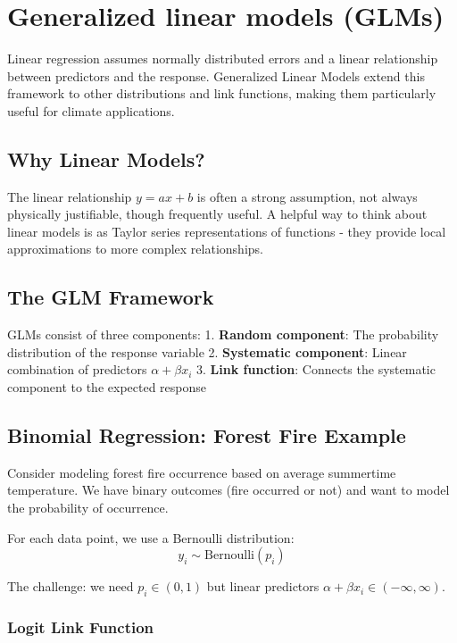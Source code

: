 \documentclass[
  letterpaper,
  DIV=11,
  numbers=noendperiod]{scrreprt}
\begin{document}
\section{Generalized linear models
(GLMs)}\label{generalized-linear-models-glms}

Linear regression assumes normally distributed errors and a linear
relationship between predictors and the response. Generalized Linear
Models extend this framework to other distributions and link functions,
making them particularly useful for climate applications.

\subsection{Why Linear Models?}\label{why-linear-models}

The linear relationship \(y = ax + b\) is often a strong assumption, not
always physically justifiable, though frequently useful. A helpful way
to think about linear models is as Taylor series representations of
functions - they provide local approximations to more complex
relationships.

\subsection{The GLM Framework}\label{the-glm-framework}

GLMs consist of three components: 1. \textbf{Random component}: The
probability distribution of the response variable 2. \textbf{Systematic
component}: Linear combination of predictors \(\alpha + \beta x_i\) 3.
\textbf{Link function}: Connects the systematic component to the
expected response

\subsection{Binomial Regression: Forest Fire
Example}\label{binomial-regression-forest-fire-example}

Consider modeling forest fire occurrence based on average summertime
temperature. We have binary outcomes (fire occurred or not) and want to
model the probability of occurrence.

For each data point, we use a Bernoulli distribution: \[
y_i \sim \mathrm{Bernoulli}(p_i)
\]

The challenge: we need \(p_i \in (0, 1)\) but linear predictors
\(\alpha + \beta x_i \in (-\infty, \infty)\).

\subsubsection{Logit Link Function}\label{logit-link-function}
\end{document}
